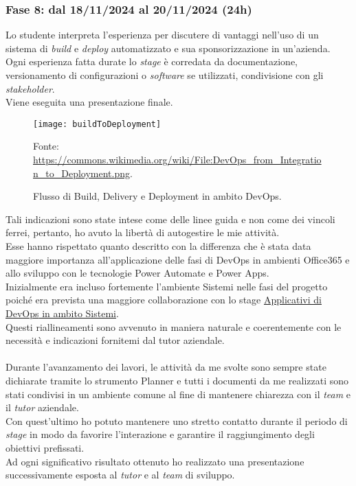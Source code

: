\subsubsection*{Fase 8: dal 18/11/2024 al 20/11/2024 (24h) }
Lo studente interpreta l'esperienza per discutere di vantaggi nell'uso di un sistema di \emph{build} e \emph{deploy} automatizzato e sua sponsorizzazione in un'azienda. Ogni esperienza fatta durate lo \emph{stage} è corredata da documentazione, versionamento di configurazioni o \emph{software} se utilizzati, condivisione con gli \emph{stakeholder}.\\
Viene eseguita una presentazione finale.\\
\begin{figure}[htbp] 
    \centering 
    \texttt{[image: buildToDeployment]}
    \caption{Flusso di Build, Delivery e Deployment in ambito DevOps.} 
    \label{fig:buildToDeployment}
    \vspace{1mm}
    Fonte: \url{https://commons.wikimedia.org/wiki/File:DevOps_from_Integration_to_Deployment.png}.
\end{figure}
\newline \noindent Tali indicazioni sono state intese come delle linee guida e non come dei vincoli ferrei, pertanto, ho avuto la libertà di autogestire le mie attività.\\
Esse hanno rispettato quanto descritto con la differenza che è stata data maggiore importanza all'applicazione delle fasi di \gls{DevOps} in ambienti Office365 e allo sviluppo con le tecnologie Power Automate e Power Apps.\\
Inizialmente era incluso fortemente l'ambiente \gls{Sistemi} nelle fasi del progetto poiché era prevista una maggiore collaborazione con lo stage \hyperref[stageDavide]{Applicativi di \gls{DevOps} in ambito Sistemi}.\\
Questi riallineamenti sono avvenuto in maniera naturale e coerentemente con le necessità e indicazioni fornitemi dal tutor aziendale.\\\\
Durante l'avanzamento dei lavori, le attività da me svolte sono sempre state dichiarate tramite lo strumento Planner e tutti i documenti da me realizzati sono stati condivisi in un ambiente comune al fine di mantenere chiarezza con il \emph{team} e il \emph{tutor} aziendale.\\
Con quest'ultimo ho potuto mantenere uno stretto contatto durante il periodo di \emph{stage} in modo da favorire l'interazione e garantire il raggiungimento degli obiettivi prefissati.\\
Ad ogni significativo risultato ottenuto ho realizzato una presentazione successivamente esposta al \emph{tutor} e al \emph{team} di sviluppo.\\

